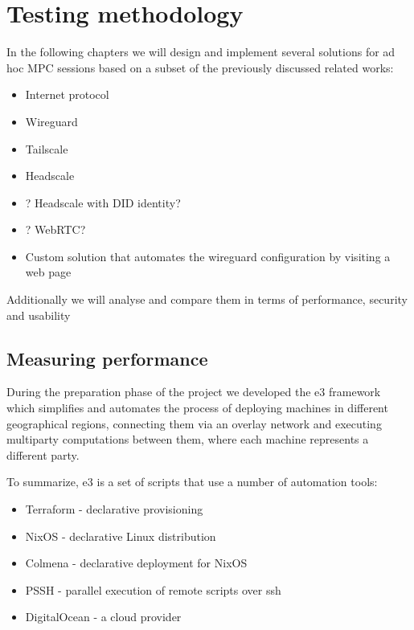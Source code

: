\hypertarget{testing-methodology}{%
\chapter{Testing methodology}\label{testing-methodology}}

In the following chapters we will design and implement several solutions
for ad hoc MPC sessions based on a subset of the previously discussed
related works:

\begin{itemize}
\tightlist
\item
  Internet protocol
\item
  Wireguard
\item
  Tailscale
\item
  Headscale
\item
  ? Headscale with DID identity?
\item
  ? WebRTC?
\item
  Custom solution that automates the wireguard configuration by visiting
  a web page
\end{itemize}

Additionally we will analyse and compare them in terms of performance,
security and usability

\hypertarget{measuring-performance}{%
\section{Measuring performance}\label{measuring-performance}}

During the preparation phase of the project we developed the \gls{e3}
framework which simplifies and automates the process of deploying
machines in different geographical regions, connecting them via an
overlay network and executing multiparty computations between them,
where each machine represents a different party.

To summarize, \gls{e3} is a set of scripts that use a number of
automation tools:

\begin{itemize}
\tightlist
\item
  Terraform - declarative provisioning
\item
  NixOS - declarative Linux distribution
\item
  Colmena - declarative deployment for NixOS
\item
  PSSH - parallel execution of remote scripts over ssh
\item
  DigitalOcean - a cloud provider
\end{itemize}


